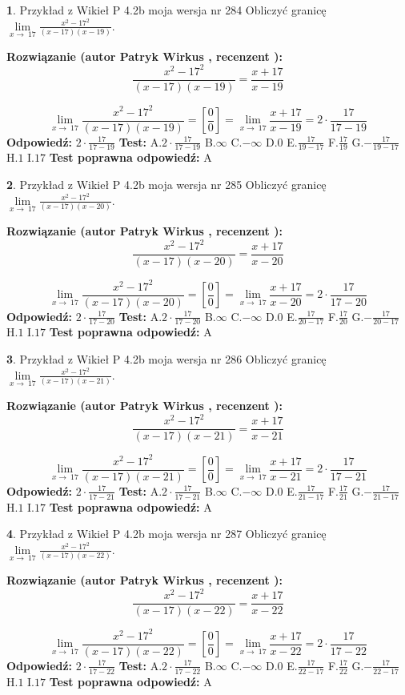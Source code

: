 \documentclass[12pt, a4paper]{article}
\theoremstyle{definition} %
\newtheorem{zad}{}
\newcommand{\zadStart}[1]{\begin{zad}#1\newline}
\newcommand{\zadStop}{\end{zad}}
\newcommand{\rozwStart}[2]{\noindent \textbf{Rozwiązanie (autor #1 , recenzent #2): }\newline}
\newcommand{\rozwStop}{\newline}
\newcommand{\odpStart}{\noindent \textbf{Odpowiedź:}\newline}
\newcommand{\odpStop}{\newline}
\newcommand{\testStart}{\noindent \textbf{Test:}\newline}
\newcommand{\testStop}{\newline}
\newcommand{\kluczStart}{\noindent \textbf{Test poprawna odpowiedź:}\newline}
\newcommand{\kluczStop}{\newline}
\begin{document}
\zadStart{Przykład z Wikieł P 4.2b moja wersja nr 284}
Obliczyć granicę $\lim\limits_{x\to\ 17}\frac{x^{2}-17^{2}}{(x-17)(x-19)}$.
\zadStop
\rozwStart{Patryk Wirkus}{}
$$\frac{x^{2}-17^{2}}{(x-17)(x-19)}=\frac{x+17}{x-19}$$

$$\lim\limits_{x\to\ 17}\frac{x^{2}-17^{2}}{(x-17)(x-19)}=[\frac{0}{0}]=\lim\limits_{x\to\ 17}\frac{x+17}{x-19}=2 \cdot \frac{17}{17-19}$$
\rozwStop
\odpStart
$2 \cdot \frac{17}{17-19}$
\odpStop
\testStart
A.$2 \cdot \frac{17}{17-19}$
B.$\infty$
C.$-\infty$
D.$0$
E.$\frac{17}{19-17}$
F.$\frac{17}{19}$
G.$-\frac{17}{19-17}$
H.$1$
I.$17$
\testStop
\kluczStart
A
\kluczStop



\zadStart{Przykład z Wikieł P 4.2b moja wersja nr 285}
Obliczyć granicę $\lim\limits_{x\to\ 17}\frac{x^{2}-17^{2}}{(x-17)(x-20)}$.
\zadStop
\rozwStart{Patryk Wirkus}{}
$$\frac{x^{2}-17^{2}}{(x-17)(x-20)}=\frac{x+17}{x-20}$$

$$\lim\limits_{x\to\ 17}\frac{x^{2}-17^{2}}{(x-17)(x-20)}=[\frac{0}{0}]=\lim\limits_{x\to\ 17}\frac{x+17}{x-20}=2 \cdot \frac{17}{17-20}$$
\rozwStop
\odpStart
$2 \cdot \frac{17}{17-20}$
\odpStop
\testStart
A.$2 \cdot \frac{17}{17-20}$
B.$\infty$
C.$-\infty$
D.$0$
E.$\frac{17}{20-17}$
F.$\frac{17}{20}$
G.$-\frac{17}{20-17}$
H.$1$
I.$17$
\testStop
\kluczStart
A
\kluczStop



\zadStart{Przykład z Wikieł P 4.2b moja wersja nr 286}
Obliczyć granicę $\lim\limits_{x\to\ 17}\frac{x^{2}-17^{2}}{(x-17)(x-21)}$.
\zadStop
\rozwStart{Patryk Wirkus}{}
$$\frac{x^{2}-17^{2}}{(x-17)(x-21)}=\frac{x+17}{x-21}$$

$$\lim\limits_{x\to\ 17}\frac{x^{2}-17^{2}}{(x-17)(x-21)}=[\frac{0}{0}]=\lim\limits_{x\to\ 17}\frac{x+17}{x-21}=2 \cdot \frac{17}{17-21}$$
\rozwStop
\odpStart
$2 \cdot \frac{17}{17-21}$
\odpStop
\testStart
A.$2 \cdot \frac{17}{17-21}$
B.$\infty$
C.$-\infty$
D.$0$
E.$\frac{17}{21-17}$
F.$\frac{17}{21}$
G.$-\frac{17}{21-17}$
H.$1$
I.$17$
\testStop
\kluczStart
A
\kluczStop



\zadStart{Przykład z Wikieł P 4.2b moja wersja nr 287}
Obliczyć granicę $\lim\limits_{x\to\ 17}\frac{x^{2}-17^{2}}{(x-17)(x-22)}$.
\zadStop
\rozwStart{Patryk Wirkus}{}
$$\frac{x^{2}-17^{2}}{(x-17)(x-22)}=\frac{x+17}{x-22}$$

$$\lim\limits_{x\to\ 17}\frac{x^{2}-17^{2}}{(x-17)(x-22)}=[\frac{0}{0}]=\lim\limits_{x\to\ 17}\frac{x+17}{x-22}=2 \cdot \frac{17}{17-22}$$
\rozwStop
\odpStart
$2 \cdot \frac{17}{17-22}$
\odpStop
\testStart
A.$2 \cdot \frac{17}{17-22}$
B.$\infty$
C.$-\infty$
D.$0$
E.$\frac{17}{22-17}$
F.$\frac{17}{22}$
G.$-\frac{17}{22-17}$
H.$1$
I.$17$
\testStop
\kluczStart
A
\kluczStop
\end{document}
